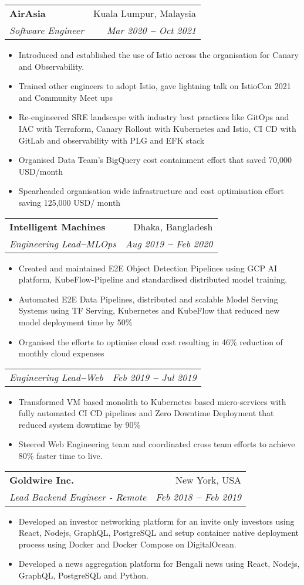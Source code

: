 \documentclass[letterpaper,11pt]{article}
\makeatletter
\newcommand{\resumeItem}[1]{
  \item\small{
    {#1 \vspace{-2pt}}
  }
}
\newcommand{\resumeSubheading}[4]{
  \vspace{-2pt}\item
    \begin{tabular*}{0.97\textwidth}[t]{l@{\extracolsep{\fill}}r}
      \textbf{#1} & #2 \\
      \textit{\small#3} & \textit{\small #4} \\
    \end{tabular*}\vspace{-7pt}
}
\newcommand{\resumeSubheadingWithoutCompany}[4]{
  \vspace{-2pt}\item
    \begin{tabular*}{0.97\textwidth}[t]{l@{\extracolsep{\fill}}r}
      
      \textit{\small#3} & \textit{\small #4} \\
    \end{tabular*}\vspace{-7pt}
}
\newcommand{\resumeItemListStart}{\begin{itemize}}
\newcommand{\resumeItemListEnd}{\end{itemize}\vspace{-5pt}}
\makeatother
\begin{document}
    \resumeSubheading
      {AirAsia}{Kuala Lumpur, Malaysia}
      {Software Engineer}{Mar 2020 \textbf{--} Oct 2021}
        \resumeItemListStart
            \resumeItem{Introduced and established the use of Istio across the organisation for Canary and Observability.}
            \resumeItem{Trained other engineers to adopt Istio, gave lightning talk on IstioCon 2021 and Community Meet ups}
            \resumeItem{Re-engineered SRE landscape with industry best practices like GitOps and IAC with Terraform, Canary Rollout with Kubernetes and Istio, CI CD with GitLab and observability with PLG and EFK stack}
            \resumeItem{Organised Data Team's BigQuery cost containment effort that saved 70,000 USD/month}
            \resumeItem{Spearheaded organisation wide infrastructure and cost optimisation effort saving 125,000 USD/ month}
        \resumeItemListEnd
    
    \resumeSubheading
      {Intelligent Machines}{Dhaka, Bangladesh}
      {Engineering Lead\textbf{--}MLOps}{Aug 2019 \textbf{--} Feb 2020}
        \resumeItemListStart
            \resumeItem{Created and maintained E2E Object Detection Pipelines using GCP AI platform, KubeFlow-Pipeline and standardised distributed model training.}
            \resumeItem{Automated E2E Data Pipelines, distributed and scalable Model Serving Systems using TF Serving, Kubernetes and KubeFlow that reduced new model deployment time by 50\%}
            \resumeItem{Organised the efforts to optimise cloud cost resulting in 46\% reduction of monthly cloud expenses}
        \resumeItemListEnd

    \resumeSubheadingWithoutCompany
      {}{}
      {Engineering Lead\textbf{--}Web}{Feb 2019 \textbf{--} Jul 2019}
        \resumeItemListStart
            \resumeItem{Transformed VM based monolith to Kubernetes based micro-services with fully automated CI CD pipelines and Zero Downtime Deployment that reduced system downtime by 90\%}
            \resumeItem{Steered Web Engineering team and coordinated cross team efforts to achieve 80\% faster time to live.}
        \resumeItemListEnd
    
    \resumeSubheading
      {Goldwire Inc.}{New York, USA}
      {Lead Backend Engineer - Remote}{Feb 2018 \textbf{--} Feb 2019}
        \resumeItemListStart
            \resumeItem{Developed an investor networking platform for an invite only investors using React, Nodejs, GraphQL, PostgreSQL and setup container native deployment process using Docker and Docker Compose on DigitalOcean.}
            \resumeItem{Developed a news aggregation platform for Bengali news using React, Nodejs, GraphQL, PostgreSQL and Python.}
        \resumeItemListEnd
\end{document}
